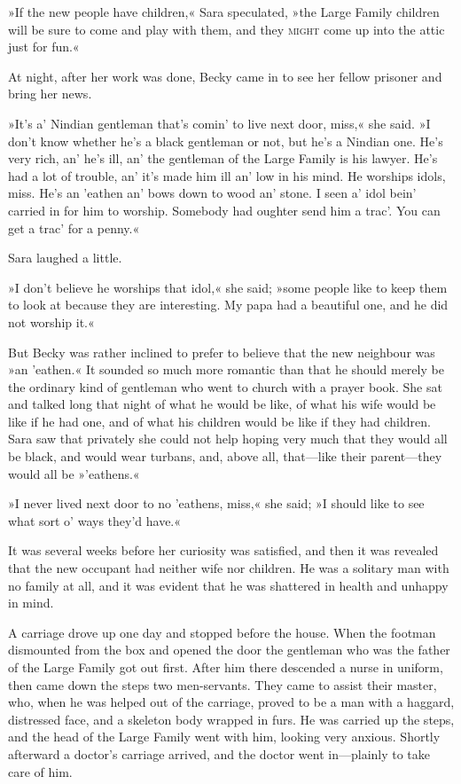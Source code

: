 »If the new people have children,« Sara speculated, »the Large Family children will be sure to come and play with them, and they \textsc{might} come up into the attic just for fun.«

At night, after her work was done, Becky came in to see her fellow prisoner and bring her news.

»It's a' Nindian gentleman that's comin' to live next door, miss,« she said. »I don't know whether he's a black gentleman or not, but he's a Nindian one. He's very rich, an' he's ill, an' the gentleman of the Large Family is his lawyer. He's had a lot of trouble, an' it's made him ill an' low in his mind. He worships idols, miss. He's an 'eathen an' bows down to wood an' stone. I seen a' idol bein' carried in for him to worship. Somebody had oughter send him a trac'. You can get a trac' for a penny.«

Sara laughed a little.

»I don't believe he worships that idol,« she said; »some people like to keep them to look at because they are interesting. My papa had a beautiful one, and he did not worship it.«

But Becky was rather inclined to prefer to believe that the new neighbour was »an 'eathen.« It sounded so much more romantic than that he should merely be the ordinary kind of gentleman who went to church with a prayer book. She sat and talked long that night of what he would be like, of what his wife would be like if he had one, and of what his children would be like if they had children. Sara saw that privately she could not help hoping very much that they would all be black, and would wear turbans, and, above all, that—like their parent—they would all be »'eathens.«

»I never lived next door to no 'eathens, miss,« she said; »I should like to see what sort o' ways they'd have.«

It was several weeks before her curiosity was satisfied, and then it was revealed that the new occupant had neither wife nor children. He was a solitary man with no family at all, and it was evident that he was shattered in health and unhappy in mind.

A carriage drove up one day and stopped before the house. When the footman dismounted from the box and opened the door the gentleman who was the father of the Large Family got out first. After him there descended a nurse in uniform, then came down the steps two men-servants. They came to assist their master, who, when he was helped out of the carriage, proved to be a man with a haggard, distressed face, and a skeleton body wrapped in furs. He was carried up the steps, and the head of the Large Family went with him, looking very anxious. Shortly afterward a doctor's carriage arrived, and the doctor went in—plainly to take care of him.

